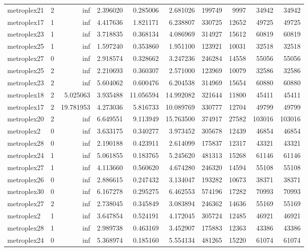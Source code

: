 \begin{longtable}{|l|r|r|r|r|r|r|r|r|r|}
metroplex21 & 2 & inf & 2.396020 & 0.285006 & 2.681026 & 199749 & 9997 & 34942 & 34942 \\
metroplex17 & 1 & inf & 4.417636 & 1.821171 & 6.238807 & 330725 & 12652 & 49725 & 49725 \\
metroplex23 & 1 & inf & 3.718835 & 0.368134 & 4.086969 & 314927 & 15612 & 60819 & 60819 \\
metroplex25 & 1 & inf & 1.597240 & 0.353860 & 1.951100 & 123921 & 10031 & 32518 & 32518 \\
metroplex27 & 0 & inf & 2.918574 & 0.328662 & 3.247236 & 246284 & 14558 & 55056 & 55056 \\
metroplex25 & 2 & inf & 2.210693 & 0.360307 & 2.571000 & 123969 & 10079 & 32586 & 32586 \\
metroplex23 & 2 & inf & 5.604062 & 0.600476 & 6.204538 & 314969 & 15654 & 60880 & 60880 \\
metroplex18 & 2 & 5.025063 & 3.935488 & 11.056594 & 14.992082 & 321644 & 11800 & 45411 & 45411 \\
metroplex17 & 2 & 19.781953 & 4.273036 & 5.816733 & 10.089769 & 330777 & 12704 & 49799 & 49799 \\
metroplex20 & 2 & inf & 6.649551 & 9.113949 & 15.763500 & 374917 & 27582 & 103016 & 103016 \\
metroplex2 & 0 & inf & 3.633175 & 0.340277 & 3.973452 & 305678 & 12439 & 46854 & 46854 \\
metroplex28 & 0 & inf & 2.190188 & 0.423911 & 2.614099 & 175837 & 12317 & 43321 & 43321 \\
metroplex24 & 1 & inf & 5.061855 & 0.183765 & 5.245620 & 481313 & 15268 & 61146 & 61146 \\
metroplex27 & 1 & inf & 4.113660 & 0.560620 & 4.674280 & 246320 & 14594 & 55108 & 55108 \\
metroplex26 & 0 & inf & 2.886615 & 0.247432 & 3.134047 & 193282 & 10673 & 38371 & 38371 \\
metroplex30 & 0 & inf & 6.167278 & 0.295275 & 6.462553 & 574196 & 17282 & 70993 & 70993 \\
metroplex27 & 2 & inf & 2.738045 & 0.345849 & 3.083894 & 246362 & 14636 & 55169 & 55169 \\
metroplex2 & 1 & inf & 3.647854 & 0.524191 & 4.172045 & 305724 & 12485 & 46921 & 46921 \\
metroplex28 & 1 & inf & 2.989738 & 0.463169 & 3.452907 & 175883 & 12363 & 43386 & 43386 \\
metroplex24 & 0 & inf & 5.368974 & 0.185160 & 5.554134 & 481265 & 15220 & 61074 & 61074 \\

\end{longtable}
